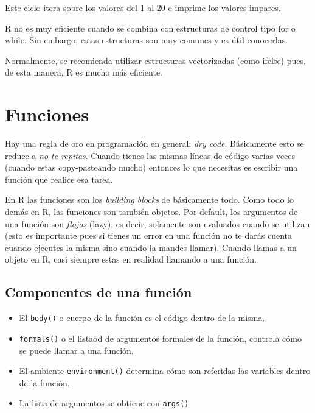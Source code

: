 \documentclass[]{article}
\newenvironment{Shaded}{\begin{snugshade}}{\end{snugshade}}
\newcommand{\KeywordTok}[1]{\textcolor[rgb]{0.13,0.29,0.53}{\textbf{{#1}}}}
\newcommand{\DecValTok}[1]{\textcolor[rgb]{0.00,0.00,0.81}{{#1}}}
\newcommand{\StringTok}[1]{\textcolor[rgb]{0.31,0.60,0.02}{{#1}}}
\newcommand{\NormalTok}[1]{{#1}}
\providecommand{\tightlist}{%
  \setlength{\itemsep}{0pt}\setlength{\parskip}{0pt}}
\begin{document}
\begin{Shaded}
\end{Shaded}

Este ciclo itera sobre los valores del 1 al 20 e imprime los valores
impares.

\begin{nota}[Importante]
R no es muy eficiente cuando se combina con estructuras de control tipo for o 
while. Sin embargo, estas estructuras son muy comunes y es útil conocerlas. 

Normalmente, se recomienda utilizar estructuras vectorizadas (como ifelse) pues,
de esta manera, R es mucho más eficiente. 
\end{nota}

\section{Funciones}\label{funciones}

Hay una regla de oro en programación en general: \emph{dry code}.
Básicamente esto se reduce a \emph{no te repitas}. Cuando tienes las
mismas líneas de código varias veces (cuando estas copy-pasteando mucho)
entonces lo que necesitas es escribir una función que realice esa tarea.

En R las funciones son los \emph{building blocks} de básicamente todo.
Como todo lo demás en R, las funciones son también objetos. Por default,
los argumentos de una función son \emph{flojos} (lazy), es decir,
solamente son evaluados cuando se utilizan (esto es importante pues si
tienes un error en una función no te darás cuenta cuando ejecutes la
misma sino cuando la mandes llamar). Cuando llamas a un objeto en R,
casi siempre estas en realidad llamando a una función.

\subsection{Componentes de una
función}\label{componentes-de-una-funcion}

\begin{itemize}
\tightlist
\item
  El \texttt{body()} o cuerpo de la función es el código dentro de la
  misma.
\item
  \texttt{formals()} o el listaod de argumentos formales de la función,
  controla cómo se puede llamar a una función.
\item
  El ambiente \texttt{environment()} determina cómo son referidas las
  variables dentro de la función.
\item
  La lista de argumentos se obtiene con \texttt{args()}
\end{itemize}
\end{document}
